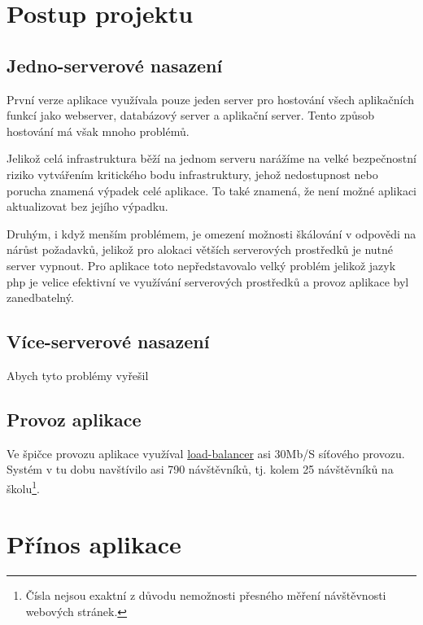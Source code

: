 
\section{Postup projektu}

\subsection{Jedno-serverové nasazení}

První verze aplikace \bso využívala pouze jeden server pro hostování všech aplikačních funkcí jako \acrshort{webserver}, databázový server a aplikační server. Tento způsob hostování má však mnoho problémů.

Jelikož celá infrastruktura běží na jednom serveru narážíme na velké bezpečnostní riziko vytvářením kritického bodu infrastruktury, jehož nedostupnost nebo porucha znamená výpadek celé aplikace. To také znamená, že není možné aplikaci aktualizovat bez jejího výpadku. 

Druhým, i když menším problémem, je omezení možnosti škálování v odpovědi na nárůst požadavků, jelikož pro alokaci větších serverových prostředků je nutné server vypnout. Pro aplikace \bso toto nepředstavovalo velký problém jelikož jazyk \acrshort{php} je velice efektivní ve využívání serverových prostředků a provoz aplikace byl zanedbatelný.

\subsection{Více-serverové nasazení}

Abych tyto problémy vyřešil

\subsection{Provoz aplikace}

Ve špičce provozu aplikace \bso využíval \hyperref[sub:load-balancing]{load-balancer} asi 30\si{Mb/S} síťového provozu. Systém v tu dobu navštívilo asi 790 návštěvníků, tj. kolem 25 návštěvníků na školu\footnote{Čísla nejsou exaktní z důvodu nemožnosti přesného měření návštěvnosti webových stránek.}.


\section{Přínos aplikace}



